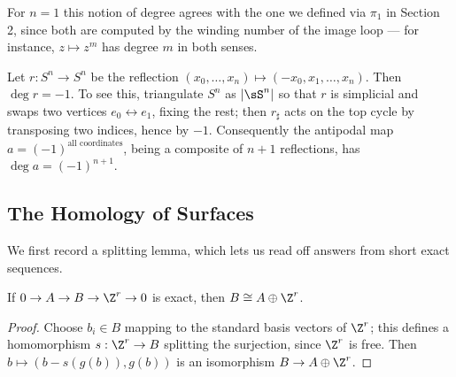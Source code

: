 For $n = 1$ this notion of degree agrees with the one we defined via $\pi_1$ in
Section 2, since both are computed by the winding number of the image loop --- for
instance, $z \mapsto z^m$ has degree $m$ in both senses.

\begin{example}
	Let $r: S^n \to S^n$ be the reflection $(x_0,\dots,x_n)\mapsto(-x_0,x_1,\dots,x_n)$. Then $\deg r = -1$. To see this, triangulate $S^n$ as $|\sS^n|$ so that $r$ is simplicial and swaps two vertices $e_0 \leftrightarrow e_1$, fixing the rest; then $r_\sharp$ acts on the top cycle by transposing two indices, hence by $-1$. Consequently the antipodal map $a = (-1)^{\text{all coordinates}}$, being a composite of $n+1$ reflections, has $\deg a = (-1)^{n+1}$.
\end{example}

\subsection{The Homology of Surfaces}

We first record a splitting lemma, which lets us read off answers from short exact
sequences.

\begin{proposition} \label{prop:splitting}
	If $0 \to A \to B \to \Z^r \to 0$ is exact, then $B \cong A \oplus \Z^r$.
\end{proposition}
\begin{proof}
	Choose $b_i \in B$ mapping to the standard basis vectors of $\Z^r$; this defines a homomorphism $s: \Z^r \to B$ splitting the surjection, since $\Z^r$ is free. Then $b \mapsto (b - s(g(b)), g(b))$ is an isomorphism $B \to A \oplus \Z^r$.
\end{proof}

